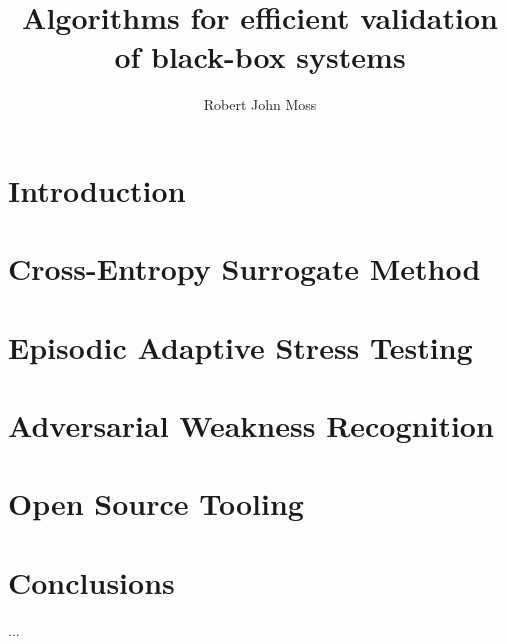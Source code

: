\documentclass{report}
\def\includebody{} %
\begin{document}
\title{Algorithms for efficient validation of black-box systems}
\author{Robert John Moss}


\beforepreface
{}

% 

\afterpreface


\chapter{Introduction}


\ifdefined\includebody
    \chapter{Cross-Entropy Surrogate Method}\label{cha:cem_variants}
    

    \chapter{Episodic Adaptive Stress Testing}\label{cha:episodic_ast}
    

    \chapter{Adversarial Weakness Recognition}\label{cha:weakness_rec}
    

    \chapter{Open Source Tooling}\label{cha:tooling}
    
\fi

\chapter{Conclusions}
...

\appendix
\ifdefined\includebody
    
\fi

% 
% 
\printbibliography
\end{document}
